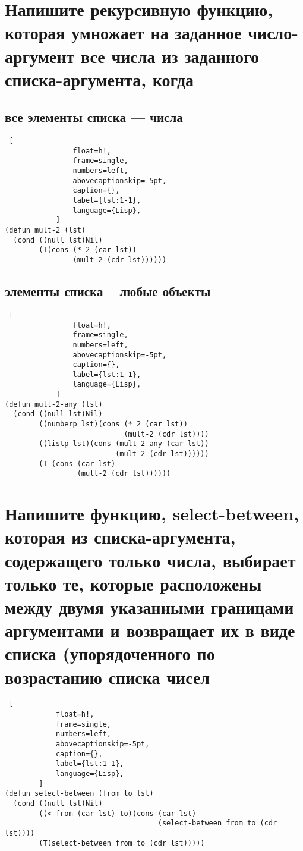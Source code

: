     \section{Напишите рекурсивную функцию, которая умножает на заданное число-аргумент все числа из заданного списка-аргумента, когда}
    
        \subsection{все элементы списка --- числа}
            \begin{lstlisting} [
            	float=h!,
            	frame=single,
            	numbers=left,
            	abovecaptionskip=-5pt,
            	caption={},
            	label={lst:1-1},
            	language={Lisp},
            ]
(defun mult-2 (lst)
  (cond ((null lst)Nil)
        (T(cons (* 2 (car lst))
                (mult-2 (cdr lst))))))
            \end{lstlisting}
            
        \subsection{элементы списка -- любые объекты}
            \begin{lstlisting} [
            	float=h!,
            	frame=single,
            	numbers=left,
            	abovecaptionskip=-5pt,
            	caption={},
            	label={lst:1-1},
            	language={Lisp},
            ]
(defun mult-2-any (lst)
  (cond ((null lst)Nil)
        ((numberp lst)(cons (* 2 (car lst))
                            (mult-2 (cdr lst))))
        ((listp lst)(cons (mult-2-any (car lst))
                          (mult-2 (cdr lst))))))
        (T (cons (car lst)
                 (mult-2 (cdr lst))))))
            \end{lstlisting}

    \section{Напишите функцию, select-between, которая из списка-аргумента, содержащего только числа, выбирает только те, которые расположены между двумя указанными границами аргументами и возвращает их в виде списка (упорядоченного по возрастанию списка чисел }
    
        \begin{lstlisting} [
        	float=h!,
        	frame=single,
        	numbers=left,
        	abovecaptionskip=-5pt,
        	caption={},
        	label={lst:1-1},
        	language={Lisp},
        ]
(defun select-between (from to lst)
  (cond ((null lst)Nil)
        ((< from (car lst) to)(cons (car lst)
                                    (select-between from to (cdr lst))))
        (T(select-between from to (cdr lst)))))
        \end{lstlisting}

